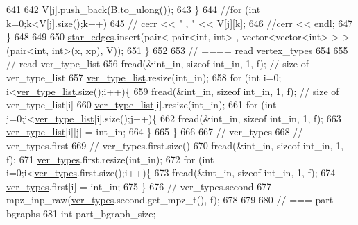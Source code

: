 \begin{DoxyCode}
641 
642         V[j].push\_back(B.to\_ulong());
643       \}
644       \textcolor{comment}{//for (int k=0;k<V[j].size();k++)}
645       \textcolor{comment}{//  cerr << " , " << V[j][k];}
646       \textcolor{comment}{//cerr << endl;}
647     \}
648 
649 
650     \hyperlink{classmarked__graph__compressed_a7df5779d313486644132bd816937f532}{star\_edges}.insert(pair< pair<int, int> , vector<vector<int> > > (pair<int, int>(x, xp), V));
651   \}
652 
653   \textcolor{comment}{// ==== read vertex\_types}
654 
655   \textcolor{comment}{// read ver\_type\_list}
656   fread(&int\_in, \textcolor{keyword}{sizeof} int\_in, 1, f); \textcolor{comment}{// size of ver\_type\_list}
657   \hyperlink{classmarked__graph__compressed_af2e3e55223d436628a02758dfae88493}{ver\_type\_list}.resize(int\_in);
658   \textcolor{keywordflow}{for} (\textcolor{keywordtype}{int} i=0; i<\hyperlink{classmarked__graph__compressed_af2e3e55223d436628a02758dfae88493}{ver\_type\_list}.size();i++)\{
659     fread(&int\_in, \textcolor{keyword}{sizeof} int\_in, 1, f); \textcolor{comment}{// size of ver\_type\_list[i]}
660     \hyperlink{classmarked__graph__compressed_af2e3e55223d436628a02758dfae88493}{ver\_type\_list}[i].resize(int\_in);
661     \textcolor{keywordflow}{for} (\textcolor{keywordtype}{int} j=0;j<\hyperlink{classmarked__graph__compressed_af2e3e55223d436628a02758dfae88493}{ver\_type\_list}[i].size();j++)\{
662       fread(&int\_in, \textcolor{keyword}{sizeof} int\_in, 1, f);
663       \hyperlink{classmarked__graph__compressed_af2e3e55223d436628a02758dfae88493}{ver\_type\_list}[i][j] = int\_in;
664     \}
665   \}
666 
667   \textcolor{comment}{// ver\_types}
668   \textcolor{comment}{// ver\_types.first}
669   \textcolor{comment}{// ver\_types.first.size()}
670   fread(&int\_in, \textcolor{keyword}{sizeof} int\_in, 1, f);
671   \hyperlink{classmarked__graph__compressed_af446cc5e23c241a92b76642fd5ebc403}{ver\_types}.first.resize(int\_in);
672   \textcolor{keywordflow}{for} (\textcolor{keywordtype}{int} i=0;i<\hyperlink{classmarked__graph__compressed_af446cc5e23c241a92b76642fd5ebc403}{ver\_types}.first.size();i++)\{
673     fread(&int\_in, \textcolor{keyword}{sizeof} int\_in, 1, f);
674     \hyperlink{classmarked__graph__compressed_af446cc5e23c241a92b76642fd5ebc403}{ver\_types}.first[i] = int\_in;
675   \}
676   \textcolor{comment}{// ver\_types.second}
677   mpz\_inp\_raw(\hyperlink{classmarked__graph__compressed_af446cc5e23c241a92b76642fd5ebc403}{ver\_types}.second.get\_mpz\_t(), f);
678 
679 
680   \textcolor{comment}{// === part bgraphs}
681   \textcolor{keywordtype}{int} part\_bgraph\_size;

\end{DoxyCode}
